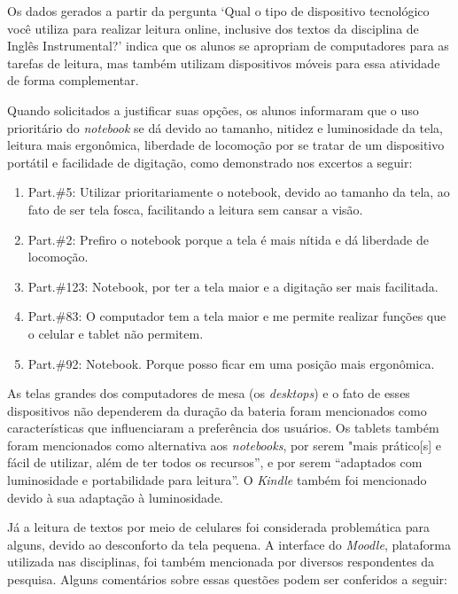 \documentclass[portuguese]{textolivre}
\begin{document}
Os dados gerados a partir da pergunta ‘Qual o tipo de dispositivo tecnológico você utiliza para realizar leitura online, inclusive dos textos da disciplina de Inglês Instrumental?’ indica que os alunos se apropriam de computadores para as tarefas de leitura, mas também utilizam dispositivos móveis para essa atividade de forma complementar.

Quando solicitados a justificar suas opções, os alunos informaram que o uso prioritário do \emph{notebook} se dá devido ao tamanho, nitidez e luminosidade da tela, leitura mais ergonômica, liberdade de locomoção por se tratar de um dispositivo portátil e facilidade de digitação, como demonstrado nos excertos a seguir:

\begin{enumerate}
    \item Part.\#5: Utilizar prioritariamente o notebook, devido ao tamanho da tela, ao fato de ser tela fosca, facilitando a leitura sem cansar a visão.  
    \item Part.\#2: Prefiro o notebook porque a tela é mais nítida e dá liberdade de  locomoção.  
    \item Part.\#123: Notebook, por ter a tela maior e a digitação ser mais facilitada.
    \item Part.\#83: O computador tem a tela maior e me permite realizar funções que o celular e tablet não permitem.
    \item Part.\#92: Notebook. Porque posso ficar em uma posição mais ergonômica.
\end{enumerate}

As telas grandes dos computadores de mesa (os \emph{desktops}) e o fato de esses dispositivos não dependerem da duração da bateria foram mencionados como características que influenciaram a preferência dos usuários. Os tablets também foram mencionados como alternativa aos \emph{notebooks}, por serem "mais prático[s] e fácil de utilizar, além de ter todos os recursos”, e por serem “adaptados com luminosidade e portabilidade para leitura”. O \emph{Kindle} também foi mencionado devido à sua adaptação à luminosidade.

Já a leitura de textos por meio de celulares foi considerada problemática para alguns, devido ao desconforto da tela pequena. A interface do \emph{Moodle}, plataforma utilizada nas disciplinas, foi também mencionada por diversos respondentes da pesquisa. Alguns comentários sobre essas questões podem ser conferidos a seguir:
\end{document}

